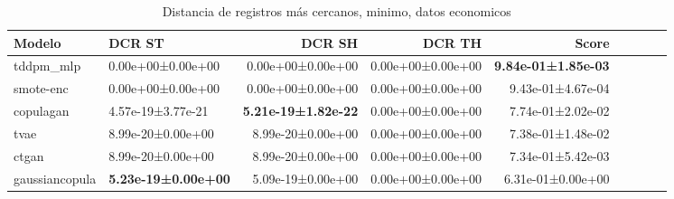 \begin{table}[H]
\centering
\fontsize{10}{14}\selectfont
\caption{Distancia de registros más cercanos, minimo, datos economicos}
\label{table-dcr-economicos-b}
\begin{tabular}{|l|l|r|r|r|r|r|r|r|}
\hline
\rowcolor[gray]{0.8}
Modelo & DCR ST & DCR SH & DCR TH & \textbf{Score} \\
\hline tddpm\_mlp & \cellcolor[rgb]{0.9, 0.54, 0.52} 0.00e+00±0.00e+00 & \cellcolor[rgb]{0.9, 0.54, 0.52} 0.00e+00±0.00e+00 & 0.00e+00±0.00e+00 & \bfseries 9.84e-01±1.85e-03 \\
\hline smote-enc & \cellcolor[rgb]{0.9, 0.54, 0.52} 0.00e+00±0.00e+00 & \cellcolor[rgb]{0.9, 0.54, 0.52} 0.00e+00±0.00e+00 & 0.00e+00±0.00e+00 & 9.43e-01±4.67e-04 \\
\hline copulagan & 4.57e-19±3.77e-21 & \bfseries 5.21e-19±1.82e-22 & 0.00e+00±0.00e+00 & 7.74e-01±2.02e-02 \\
\hline tvae & 8.99e-20±0.00e+00 & 8.99e-20±0.00e+00 & 0.00e+00±0.00e+00 & 7.38e-01±1.48e-02 \\
\hline ctgan & 8.99e-20±0.00e+00 & 8.99e-20±0.00e+00 & 0.00e+00±0.00e+00 & 7.34e-01±5.42e-03 \\
\hline gaussiancopula & \bfseries 5.23e-19±0.00e+00 & 5.09e-19±0.00e+00 & 0.00e+00±0.00e+00 & \cellcolor[rgb]{0.9, 0.54, 0.52} 6.31e-01±0.00e+00 \\
\hline
\end{tabular}
\end{table}
